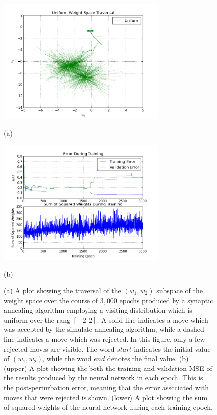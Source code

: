 \documentclass[11pt]{afthesis}
\begin{document}
	 
   	\begin{figure}[ht!]
   		
   		\begin{minipage}[b]{0.5\linewidth}
   			\centering
   			\centerline{\includegraphics[width = 3.25in]{figures/weight_space_uniform.png}}
   			\centerline{(a)}\medskip
   		\end{minipage}
   		\hfill
   		\begin{minipage}[b]{0.5\linewidth}
   			\centering
   			\centerline{\includegraphics[width = 3.25in]{figures/weight_space_uniform_perf.png}}
   			\centerline{(b)}\medskip
   		\end{minipage}
   		\caption{(a) A plot showing the traversal of the $(w_1,w_2)$ subspace of the weight space over the course of $3,000$ epochs produced by a synaptic annealing algorithm employing a visiting distribution which is uniform over the rang $[-2,2]$. A solid line indicates a move which was accepted by the simulate annealing algorithm, while a dashed line indicates a move which was rejected. In this figure, only a few rejected moves are visible. The word $start$ indicates the initial value of $(w_1,w_2)$, while the word $end$ denotes the final value. (b) (upper) A plot showing the both the training and validation MSE of the results produced by the neural network in each epoch. This is the post-perturbation error, meaning that the error associated with moves that were rejected is shown. (lower) A plot showing the sum of squared weights of the neural network during each training epoch.}
   		\label{fig:weight_space_uniform}
   		
   	\end{figure}
   	
\end{document}

